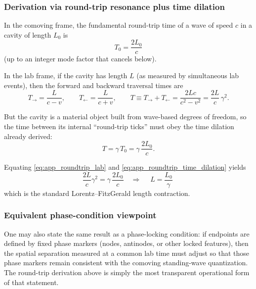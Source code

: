 \documentclass[11pt]{article}
\begin{document}
\subsubsection{Derivation via round-trip resonance plus time dilation}

In the comoving frame, the fundamental round-trip time of a wave of speed $c$
in a cavity of length $L_0$ is
\begin{equation}
T_0 = \frac{2L_0}{c}
\label{eq:app_roundtrip_rest}
\end{equation}
(up to an integer mode factor that cancels below).

In the lab frame, if the cavity has length $L$ (as measured by simultaneous lab
events), then the forward and backward traversal times are
\begin{equation}
T_{\rightarrow}=\frac{L}{c-v},
\qquad
T_{\leftarrow}=\frac{L}{c+v},
\qquad
T \equiv T_{\rightarrow}+T_{\leftarrow}
= \frac{2Lc}{c^2-v^2}
= \frac{2L}{c}\,\gamma^2.
\label{eq:app_roundtrip_lab}
\end{equation}

But the cavity is a material object built from wave-based degrees of freedom,
so the time between its internal ``round-trip ticks'' must obey the time
dilation already derived:
\begin{equation}
T = \gamma\,T_0 = \gamma\,\frac{2L_0}{c}.
\label{eq:app_roundtrip_time_dilation}
\end{equation}

Equating \eqref{eq:app_roundtrip_lab} and \eqref{eq:app_roundtrip_time_dilation}
yields
\begin{equation}
\frac{2L}{c}\gamma^2 = \gamma\,\frac{2L_0}{c}
\quad\Rightarrow\quad
\boxed{\;L = \frac{L_0}{\gamma}\;}
\label{eq:app_length_contraction}
\end{equation}
which is the standard Lorentz--FitzGerald length contraction.

\subsubsection{Equivalent phase-condition viewpoint}

One may also state the same result as a phase-locking condition: if endpoints
are defined by fixed phase markers (nodes, antinodes, or other locked features),
then the spatial separation measured at a common lab time must adjust so that
those phase markers remain consistent with the comoving standing-wave
quantization. The round-trip derivation above is simply the most transparent
operational form of that statement.
\end{document}
